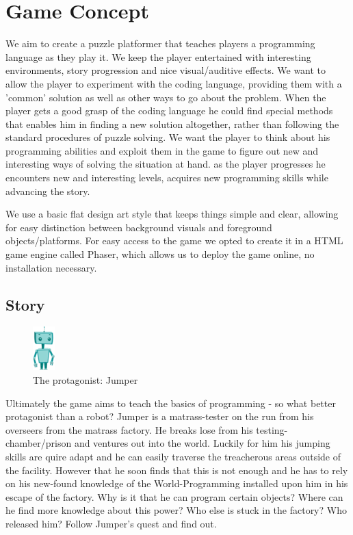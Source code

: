 \documentclass[a4paper,twoside,12pt]{article}
\begin{document}
\section{Game Concept}
We aim to create a puzzle platformer that teaches players a programming language as they play it. We keep the player entertained with interesting environments, story progression and nice visual/auditive effects. We want to allow the player to experiment with the coding language, providing them with a 'common' solution as well as other ways to go about the problem. When the player gets a good grasp of the coding language he could find special methods that enables him in finding a new solution altogether, rather than following the standard procedures of puzzle solving. We want the player to think about his programming abilities and exploit them in the game to figure out new and interesting ways of solving the situation at hand.
as the player progresses he encounters new and interesting levels, acquires new programming skills while advancing the story.

We use a basic flat design art style that keeps things simple and clear, allowing for easy distinction between background visuals and foreground objects/platforms. For easy access to the game we opted to create it in a HTML game engine called Phaser, which allows us to deploy the game online, no installation necessary.

\subsection{Story}

\begin{figure}[h]
\centering
\includegraphics[scale=1.5]{robot}
\caption{The protagonist: Jumper}
\end{figure}

Ultimately the game aims to teach the basics of programming - so what better protagonist than a robot?
Jumper is a matrass-tester on the run from his overseers from the matrass factory. He breaks lose from his testing-chamber/prison and ventures out into the world. Luckily for him his jumping skills are quire adapt and he can easily traverse the treacherous areas outside of the facility. However that he soon finds that this is not enough and he has to rely on his new-found knowledge of the World-Programming installed upon him in his escape of the factory. Why is it that he can program certain objects? Where can he find more knowledge about this power? Who else is stuck in the factory? Who released him? Follow Jumper's quest and find out.
\end{document}
